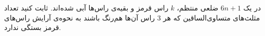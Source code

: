     \p 
در یک
$6n + 1$
ضلعی منتظم،
$k$
راس قرمز و بقیه‌ی راس‌ها آبی شده‌اند. ثابت کنید تعداد مثلث‌های متساوی‌الساقین که هر
$3$
راس آن‌ها هم‌رنگ باشند به نحوه‌ی آرایش راس‌های قرمز بستگی ندارد.